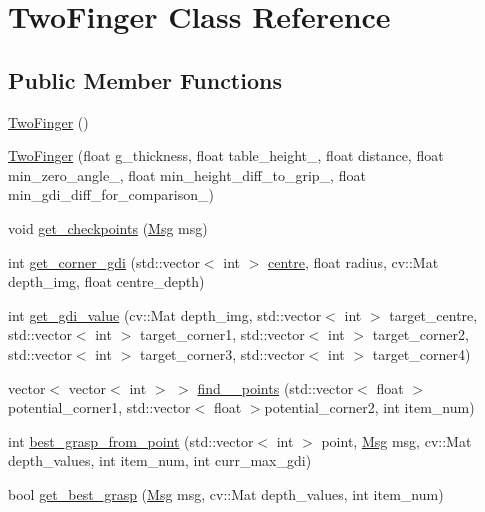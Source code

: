 \hypertarget{classTwoFinger}{}\section{Two\+Finger Class Reference}
\label{classTwoFinger}
\subsection*{Public Member Functions}
\begin{DoxyCompactItemize}
\item 
\hyperlink{classTwoFinger_a17e7b3ee5b7e21d99b99968c9c14ac87}{Two\+Finger} ()
\item 
\hyperlink{classTwoFinger_ab0708e05d9ebf755745c14293cf6ddca}{Two\+Finger} (float g\+\_\+thickness, float table\+\_\+height\+\_\+, float distance, float min\+\_\+zero\+\_\+angle\+\_\+, float min\+\_\+height\+\_\+diff\+\_\+to\+\_\+grip\+\_\+, float min\+\_\+gdi\+\_\+diff\+\_\+for\+\_\+comparison\+\_\+)
\item 
void \hyperlink{classTwoFinger_a36ecc602dc5e27c172e62b71ed5d2577}{get\+\_\+checkpoints} (\hyperlink{classMsg}{Msg} msg)
\item 
int \hyperlink{classTwoFinger_a364371baead95faf819ba910fa60e9fd}{get\+\_\+corner\+\_\+gdi} (std\+::vector$<$ int $>$ \hyperlink{classTwoFinger_a2a3e8cfa8504784fcfdcf782deeb6864}{centre}, float radius, cv\+::\+Mat depth\+\_\+img, float centre\+\_\+depth)
\item 
int \hyperlink{classTwoFinger_a9f629646c344238a7b45c68a8f92e179}{get\+\_\+gdi\+\_\+value} (cv\+::\+Mat depth\+\_\+img, std\+::vector$<$ int $>$ target\+\_\+centre, std\+::vector$<$ int $>$ target\+\_\+corner1, std\+::vector$<$ int $>$ target\+\_\+corner2, std\+::vector$<$ int $>$ target\+\_\+corner3, std\+::vector$<$ int $>$ target\+\_\+corner4)
\item 
vector$<$ vector$<$ int $>$ $>$ \hyperlink{classTwoFinger_aaa139685eb927fad02edc52afde35a23}{find\+\_\+\_\+points} (std\+::vector$<$ float $>$ potential\+\_\+corner1, std\+::vector$<$ float $>$potential\+\_\+corner2, int item\+\_\+num)
\item 
int \hyperlink{classTwoFinger_a80d8942ee06dde64fdb4d8928903b4f2}{best\+\_\+grasp\+\_\+from\+\_\+point} (std\+::vector$<$ int $>$ point, \hyperlink{classMsg}{Msg} msg, cv\+::\+Mat depth\+\_\+values, int item\+\_\+num, int curr\+\_\+max\+\_\+gdi)
\item 
bool \hyperlink{classTwoFinger_a4d2eda71d6d313d4b775636d45db1685}{get\+\_\+best\+\_\+grasp} (\hyperlink{classMsg}{Msg} msg, cv\+::\+Mat depth\+\_\+values, int item\+\_\+num)
\end{DoxyCompactItemize}
